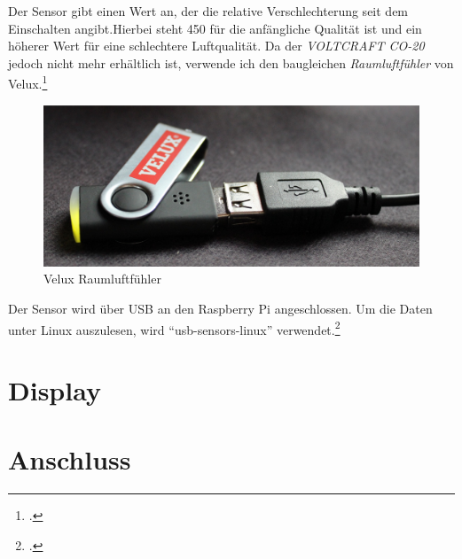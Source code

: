 Der Sensor gibt einen Wert an, der die relative Verschlechterung seit dem Einschalten angibt.Hierbei steht 450 für die anfängliche Qualität ist und ein höherer Wert für eine schlechtere Luftqualität.
Da der \textit{VOLTCRAFT CO-20} jedoch nicht mehr erhältlich ist, verwende ich den baugleichen \textit{Raumluftfühler} von Velux.\footcite{Velux}

\begin{figure}[h]
  \centering
     \includegraphics[width=\textwidth]{figures/velux.jpg}
  \caption{Velux Raumluftfühler}
  \label{fig:velux}
\end{figure}

Der Sensor wird über USB an den Raspberry Pi angeschlossen. Um die Daten unter Linux auszulesen, wird \enquote{usb-sensors-linux} verwendet.\footcite{usb-sensors-linux}

\section{Display}
\section{Anschluss}
